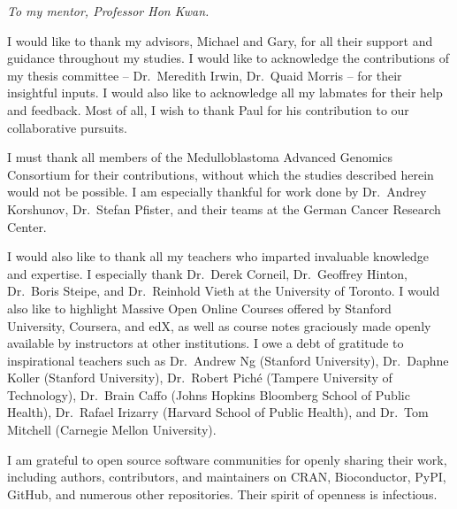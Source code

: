 \documentclass[12pt]{ut-thesis}
\begin{document}
\begin{preliminary}

\begin{dedication}
\begin{center}
\vspace{1in}
\emph{To my mentor, Professor Hon Kwan.}
\end{center}
\end{dedication}

\newpage

\begin{acknowledgements}
I would like to thank my advisors, Michael and Gary, for all their support and guidance throughout my studies. I would like to acknowledge the contributions of my thesis committee -- Dr.\ Meredith Irwin, Dr.\ Quaid Morris -- for their insightful inputs. I would also like to acknowledge all my labmates for their help and feedback. Most of all, I wish to thank Paul for his contribution to our collaborative pursuits.

I must thank all members of the Medulloblastoma Advanced Genomics Consortium for their contributions, without which the studies described herein would not be possible. I am especially thankful for work done by Dr.\ Andrey Korshunov, Dr.\ Stefan Pfister, and their teams at the German Cancer Research Center.

I would also like to thank all my teachers who imparted invaluable knowledge and expertise. I especially thank Dr.\ Derek Corneil, Dr.\ Geoffrey Hinton, Dr.\ Boris Steipe, and Dr.\ Reinhold Vieth at the University of Toronto. I would also like to highlight Massive Open Online Courses offered by Stanford University, Coursera, and edX, as well as course notes graciously made openly available by instructors at other institutions. I owe a debt of gratitude to inspirational teachers such as Dr.\ Andrew Ng (Stanford University), Dr.\ Daphne Koller (Stanford University), Dr.\ Robert Pich\'{e} (Tampere University of Technology), Dr.\ Brain Caffo (Johns Hopkins Bloomberg School of Public Health), Dr.\ Rafael Irizarry (Harvard School of Public Health), and Dr.\ Tom Mitchell (Carnegie Mellon University).

I am grateful to open source software communities for openly sharing their work, including authors, contributors, and maintainers on CRAN, Bioconductor, PyPI, GitHub, and numerous other repositories. Their spirit of openness is infectious.


\end{acknowledgements}
\end{preliminary}
\end{document}
